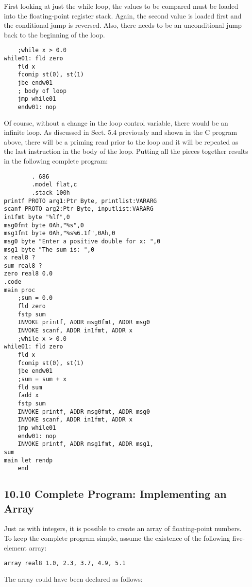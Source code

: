 \documentclass[10pt]{article}
\begin{document}
First looking at just the while loop, the values to be compared must be loaded into the floating-point register stack. Again, the second value is loaded first and the conditional jump is reversed. Also, there needs to be an unconditional jump back to the beginning of the loop.

\begin{verbatim}
    ;while x > 0.0
while01: fld zero
    fld x
    fcomip st(0), st(1)
    jbe endw01
    ; body of loop
    jmp while01
    endw01: nop
\end{verbatim}

Of course, without a change in the loop control variable, there would be an infinite loop. As discussed in Sect. 5.4 previously and shown in the C program above, there will be a priming read prior to the loop and it will be repeated as the last instruction in the body of the loop. Putting all the pieces together results in the following complete program:

\begin{verbatim}
        . 686
        .model flat,c
        .stack 100h
printf PROTO arg1:Ptr Byte, printlist:VARARG
scanf PROTO arg2:Ptr Byte, inputlist:VARARG
in1fmt byte "%lf",0
msg0fmt byte 0Ah,"%s",0
msg1fmt byte 0Ah,"%s%6.1f",0Ah,0
msg0 byte "Enter a positive double for x: ",0
msg1 byte "The sum is: ",0
x real8 ?
sum real8 ?
zero real8 0.0
.code
main proc
    ;sum = 0.0
    fld zero
    fstp sum
    INVOKE printf, ADDR msg0fmt, ADDR msg0
    INVOKE scanf, ADDR in1fmt, ADDR x
    ;while x > 0.0
while01: fld zero
    fld x
    fcomip st(0), st(1)
    jbe endw01
    ;sum = sum + x
    fld sum
    fadd x
    fstp sum
    INVOKE printf, ADDR msg0fmt, ADDR msg0
    INVOKE scanf, ADDR in1fmt, ADDR x
    jmp while01
    endw01: nop
    INVOKE printf, ADDR msg1fmt, ADDR msg1,
sum
main let rendp
    end
\end{verbatim}

\subsection*{10.10 Complete Program: Implementing an Array}
Just as with integers, it is possible to create an array of floating-point numbers. To keep the complete program simple, assume the existence of the following five-element array:

\begin{verbatim}
array real8 1.0, 2.3, 3.7, 4.9, 5.1
\end{verbatim}

The array could have been declared as follows:
\end{document}

